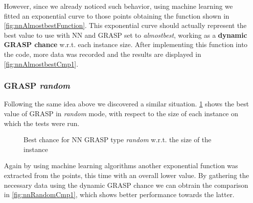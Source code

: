 However, since we already noticed such behavior, using machine learning we fitted an exponential curve to those points obtaining the function shown in \figurename{ \ref{fig:nnAlmostbestFunction}}.
This exponential curve should actually represent the best value to use with NN and GRASP set to \textit{almostbest}, working as a \textbf{dynamic GRASP chance} w.r.t. each instance size.
After implementing this function into the code, more data was recorded and the results are displayed in \figurename{ \ref{fig:nnAlmostbestCmp1}}.

\subsubsection{GRASP \textit{random}}

Following the same idea above we discovered a similar situation.
\figurename{ \ref{fig:nnRandomFunction}} shows the best value of GRASP in \textit{random} mode, with respect to the size of each instance on which the tests were run.

\begin{figure}[H]
	\centering
	\caption{Best chance for NN GRASP type \textit{random} w.r.t. the size of the instance}
    \label{fig:nnRandomFunction}
\end{figure}

Again by using machine learning algorithms another exponential function was extracted from the points, this time with an overall lower value.
By gathering the necessary data using the dynamic GRASP chance we can obtrain the comparison in \figurename{ \ref{fig:nnRandomCmp1}}, which shows better performance towards the latter.

